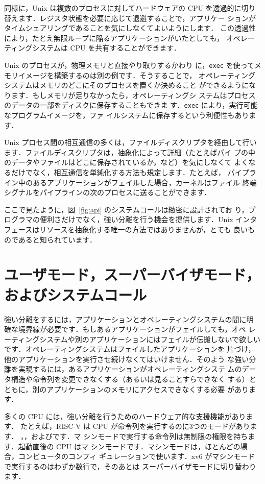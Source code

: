 同様に，Unix は複数のプロセスに対してハードウェアの CPU を透過的に切り
替えます．レジスタ状態を必要に応じて退避することで，アプリケー
ションがタイムシェアリングであることを気にしなくてよいようにします．
この透過性により，たとえ無限ループに陥るアプリケーションがいたとしても，
オペレーティングシステムは CPU を共有することができます．

Unix のプロセスが，物理メモリと直接やり取りするかわり
に，\lstinline{exec} を使ってメモリイメージを構築するのは別の例です．そうすることで，
オペレーティングシステムはメモリのどこにそのプロセスを置くか決めること
ができるようになります．もしメモリが足りなかったら，オペレーティングシ
ステムはプロセスのデータの一部をディスクに保存することもできま
す．\lstinline{exec} により，実行可能なプログラムイメージを，ファ
イルシステムに保存するという利便性もあります．

Unix プロセス間の相互通信の多くは，ファイルディスクリプタを経由して行い
ます．ファイルディスクリプタは，抽象化によって詳細（たとえばパイ
プの中のデータやファイルはどこに保存されているか，など）を気にしなくて
よくなるだけでなく，相互通信を単純化する方法も規定します．たとえば，
パイプライン中のあるアプリケーションがフェイルした場合，カーネルはファイル
終端シグナルをパイプラインの次のプロセスに送ることができます．

ここで見たように，図~\ref{fig:api} のシステムコールは緻密に設計されてお
り，プログラマの便利さだけでなく，強い分離を行う機会を提供します．Unix
インタフェースはリソースを抽象化する唯一の方法ではありませんが，とても
良いものであると知られています．

\section{ユーザモード，スーパーバイザモード，およびシステムコール}

強い分離をするには，アプリケーションとオペレーティングシステムの間に明
確な境界線が必要です．もしあるアプリケーションがフェイルしても，オペ
レーティングシステムや別のアプリケーションにはフェイルが伝搬しないで欲しい
です．オペレーティングシステムはフェイルしたアプリケーションを
片づけ，他のアプリケーションを実行させ続けなくてはいけません．そのよう
な強い分離を実現するには，あるアプリケーションがオペレーティングシステ
ムのデータ構造や命令列を変更できなくする（あるいは見ることすらできなく
する）とともに，別のアプリケーションのメモリにアクセスできなくする必要
があります．

多くの CPU には，強い分離を行うためのハードウェア的な支援機能があります．
たとえば，RISC-V は CPU が命令列を実行するのに3つのモードがあります．
，，およびです．マ
シンモードで実行する命令列は無制限の権限を持ちます．起動直後の CPU はマ
シンモードです．マシンモードは，ほとんどの場合，コンピュータのコンフィ
ギュレーションで使います．xv6 がマシンモードで実行するのはわずか数行で，そのあとは
スーパーバイザモードに切り替わります．

